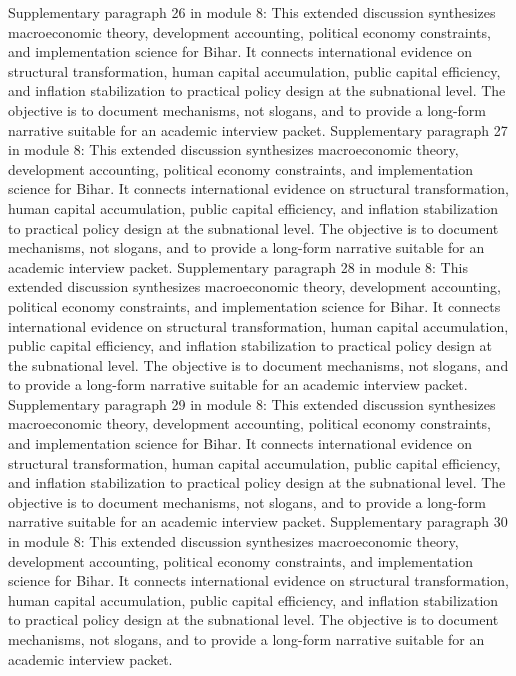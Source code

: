 \documentclass[preprint,12pt]{elsarticle}
\begin{document}
Supplementary paragraph 26 in module 8: This extended discussion synthesizes macroeconomic theory, development accounting, political economy constraints, and implementation science for Bihar. It connects international evidence on structural transformation, human capital accumulation, public capital efficiency, and inflation stabilization to practical policy design at the subnational level. The objective is to document mechanisms, not slogans, and to provide a long-form narrative suitable for an academic interview packet.
Supplementary paragraph 27 in module 8: This extended discussion synthesizes macroeconomic theory, development accounting, political economy constraints, and implementation science for Bihar. It connects international evidence on structural transformation, human capital accumulation, public capital efficiency, and inflation stabilization to practical policy design at the subnational level. The objective is to document mechanisms, not slogans, and to provide a long-form narrative suitable for an academic interview packet.
Supplementary paragraph 28 in module 8: This extended discussion synthesizes macroeconomic theory, development accounting, political economy constraints, and implementation science for Bihar. It connects international evidence on structural transformation, human capital accumulation, public capital efficiency, and inflation stabilization to practical policy design at the subnational level. The objective is to document mechanisms, not slogans, and to provide a long-form narrative suitable for an academic interview packet.
Supplementary paragraph 29 in module 8: This extended discussion synthesizes macroeconomic theory, development accounting, political economy constraints, and implementation science for Bihar. It connects international evidence on structural transformation, human capital accumulation, public capital efficiency, and inflation stabilization to practical policy design at the subnational level. The objective is to document mechanisms, not slogans, and to provide a long-form narrative suitable for an academic interview packet.
Supplementary paragraph 30 in module 8: This extended discussion synthesizes macroeconomic theory, development accounting, political economy constraints, and implementation science for Bihar. It connects international evidence on structural transformation, human capital accumulation, public capital efficiency, and inflation stabilization to practical policy design at the subnational level. The objective is to document mechanisms, not slogans, and to provide a long-form narrative suitable for an academic interview packet.
\end{document}

